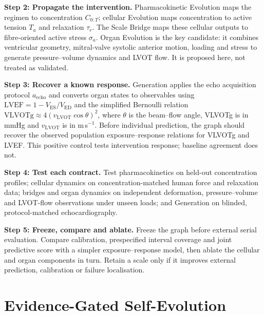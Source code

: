 \documentclass[12pt, letterpaper]{article} %
\begin{document}
\begin{center}
{\begin{minipage}{\dimexpr\textwidth-2\fboxsep\relax}
\begin{minipage}[t]{0.485\linewidth}
\textbf{Step 2: Propagate the intervention.}
Pharmacokinetic Evolution maps the regimen to concentration $C_{0:T}$; cellular Evolution maps concentration to active tension $T_a$ and relaxation $\tau_r$. The Scale Bridge maps these cellular outputs to fibre-oriented active stress $\sigma_a$. Organ Evolution is the key candidate: it combines ventricular geometry, mitral-valve systolic anterior motion, loading and stress to generate pressure--volume dynamics and LVOT flow. It is proposed here, not treated as validated.
\end{minipage}\hfill
\begin{minipage}[t]{0.485\linewidth}
\vspace{0pt}
\textbf{Step 3: Recover a known response.}
Generation applies the echo acquisition protocol $a_{\mathrm{echo}}$ and converts organ states to observables using $\mathrm{LVEF}=1-V_{\mathrm{ES}}/V_{\mathrm{ED}}$ and the simplified Bernoulli relation $\mathrm{VLVOTg}\approx4(v_{\mathrm{LVOT}}\cos\theta)^2$, where $\theta$ is the beam--flow angle, VLVOTg is in mmHg and $v_{\mathrm{LVOT}}$ is in m\,s$^{-1}$. Before individual prediction, the graph should recover the observed population exposure--response relations for VLVOTg and LVEF. This positive control tests intervention response; baseline agreement does not.

\textbf{Step 4: Test each contract.}
Test pharmacokinetics on held-out concentration profiles; cellular dynamics on concentration-matched human force and relaxation data; bridges and organ dynamics on independent deformation, pressure--volume and LVOT-flow observations under unseen loads; and Generation on blinded, protocol-matched echocardiography.

\textbf{Step 5: Freeze, compare and ablate.}
Freeze the graph before external serial evaluation. Compare calibration, prespecified interval coverage and joint predictive score with a simpler exposure--response model, then ablate the cellular and organ components in turn. Retain a scale only if it improves external prediction, calibration or failure localisation.
\end{minipage}

\end{minipage}}
\endgroup
\end{center}

\section{Evidence-Gated Self-Evolution}
\end{document}
